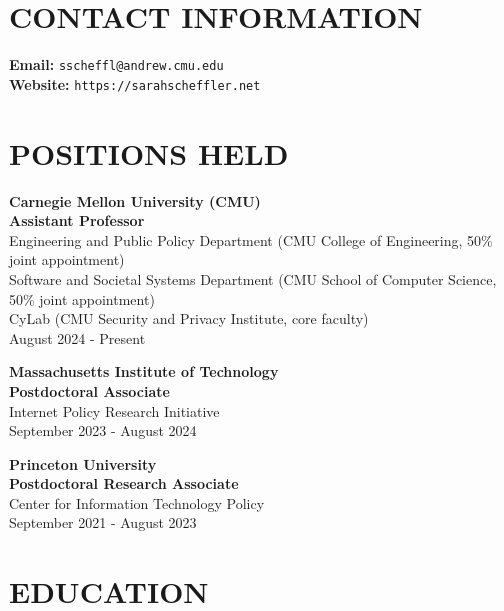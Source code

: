 \documentclass{res}
\begin{document}
 



                                  
\begin{resume}

\vspace{0.1in}

\section{CONTACT INFORMATION}  
\vspace{0.1in}
\textbf{Email:} \texttt{sscheffl@andrew.cmu.edu} \\
\textbf{Website:} \texttt{https://sarahscheffler.net}

\vspace{-0.25in}
\section{POSITIONS HELD}  
\vspace{0.1in}

\textbf{Carnegie Mellon University (CMU)} \\
\textbf{Assistant Professor} \\
Engineering and Public Policy Department (CMU College of Engineering, 50\% joint appointment) \\
Software and Societal Systems Department (CMU School of Computer Science, 50\% joint appointment) \\
CyLab (CMU Security and Privacy Institute, core faculty) \\
August 2024 - Present

\textbf{Massachusetts Institute of Technology} \\
\textbf{Postdoctoral Associate} \\
Internet Policy Research Initiative \\
September 2023 - August 2024

\textbf{Princeton University} \\
\textbf{Postdoctoral Research Associate} \\
Center for Information Technology Policy \\
September 2021 - August 2023



\section{EDUCATION}  
\vspace{0.1in}


\end{resume}
\end{document}
